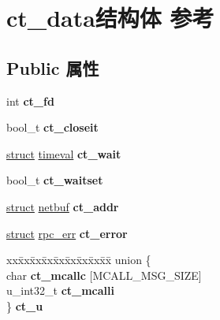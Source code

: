 \hypertarget{structct__data}{}\section{ct\+\_\+data结构体 参考}
\label{structct__data}
\subsection*{Public 属性}
\begin{DoxyCompactItemize}
\item 
\mbox{\label{structct__data_a1f100345cc5beacda0767956552788aa}} 
int {\bfseries ct\+\_\+fd}
\item 
\mbox{\label{structct__data_a451406743e036900c586d09718d87c67}} 
bool\+\_\+t {\bfseries ct\+\_\+closeit}
\item 
\mbox{\label{structct__data_aa02f8544e1acc0f9c88926ad4c6ac95e}} 
\hyperlink{interfacestruct}{struct} \hyperlink{structtimeval}{timeval} {\bfseries ct\+\_\+wait}
\item 
\mbox{\label{structct__data_a3ef61c766627722b8a32efe335090541}} 
bool\+\_\+t {\bfseries ct\+\_\+waitset}
\item 
\mbox{\label{structct__data_a12a4053d6d8d281324f1da792c9588ca}} 
\hyperlink{interfacestruct}{struct} \hyperlink{structnetbuf}{netbuf} {\bfseries ct\+\_\+addr}
\item 
\mbox{\label{structct__data_a81aac1311eefcd806c50f53e3ffcd115}} 
\hyperlink{interfacestruct}{struct} \hyperlink{structrpc__err}{rpc\+\_\+err} {\bfseries ct\+\_\+error}
\item 
\mbox{\label{structct__data_addea53bb8c6e095437cc7aadb95a3b93}} 
\begin{tabbing}
xx\=xx\=xx\=xx\=xx\=xx\=xx\=xx\=xx\=\kill
union \{\\
\>char {\bfseries ct\_mcallc} \mbox{[}MCALL\_MSG\_SIZE\mbox{]}\\
\>u\_int32\_t {\bfseries ct\_mcalli}\\
\} {\bfseries ct\_u}\\


\end{tabbing}
\end{DoxyCompactItemize}
